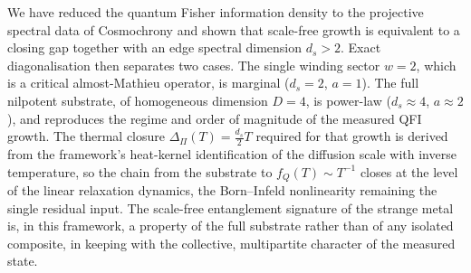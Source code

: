 \documentclass[11pt]{article}
\newcommand{\DPi}{\Delta_\Pi}
\newcommand{\fQ}{f_Q}
\begin{document}
We have reduced the quantum Fisher information density to the projective spectral data of Cosmochrony and shown
that scale-free growth is equivalent to a closing gap together with an edge spectral dimension $d_s>2$.
Exact diagonalisation then separates two cases.
The single winding sector $w=2$, which is a critical almost-Mathieu operator, is marginal ($d_s=2$, $a=1$).
The full nilpotent substrate, of homogeneous dimension $D=4$, is power-law ($d_s\approx 4$, $a\approx 2$), and
reproduces the regime and order of magnitude of the measured QFI growth.
The thermal closure $\DPi(T)=\tfrac{d_s}{2}T$ required for that growth is derived from the framework's heat-kernel
identification of the diffusion scale with inverse temperature, so the chain from the substrate to
$\fQ(T)\sim T^{-1}$ closes at the level of the linear relaxation dynamics, the Born--Infeld nonlinearity remaining
the single residual input.
The scale-free entanglement signature of the strange metal is, in this framework, a property of the full substrate
rather than of any isolated composite, in keeping with the collective, multipartite character of the measured
state.

\newpage


\end{document}
